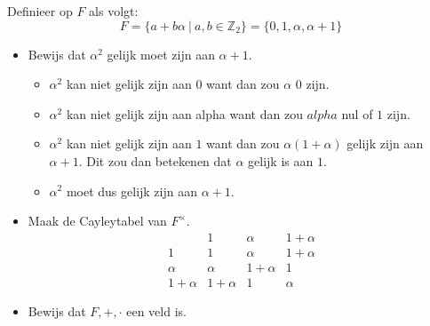 \documentclass[main.tex]{subfiles}
\begin{document}
Definieer op $F$ als volgt:
\[ F = \{ a + b\alpha \ |\ a,b \in \mathbb{Z}_{2} \} = \{ 0,1,\alpha,\alpha+1 \} \]
\begin{itemize}
\item Bewijs dat $\alpha^{2}$ gelijk moet zijn aan $\alpha+1$.
  \begin{itemize}
  \item $\alpha^{2}$ kan niet gelijk zijn aan $0$ want dan zou $\alpha$ $0$ zijn.
  \item $\alpha^{2}$ kan niet gelijk zijn aan alpha want dan zou $alpha$ nul of $1$ zijn.
  \item $\alpha^{2}$ kan niet gelijk zijn aan $1$ want dan zou $\alpha(1+\alpha)$ gelijk zijn aan $\alpha+1$.
    Dit zou dan betekenen dat $\alpha$ gelijk is aan $1$.
  \item $\alpha^{2}$ moet dus gelijk zijn aan $\alpha+1$. 
  \end{itemize}
\item Maak de Cayleytabel van $F^{\times}$.
  \[
  \begin{array}{c|ccc}
    & 1 & \alpha & 1+\alpha\\ \hline
    1 & 1 & \alpha & 1 + \alpha\\
    \alpha & \alpha &1 + \alpha & 1\\
    1 + \alpha & 1 + \alpha & 1 & \alpha
  \end{array}
  \]
\item Bewijs dat $F,+,\cdot$ een veld is.
\end{itemize}
\end{document}
